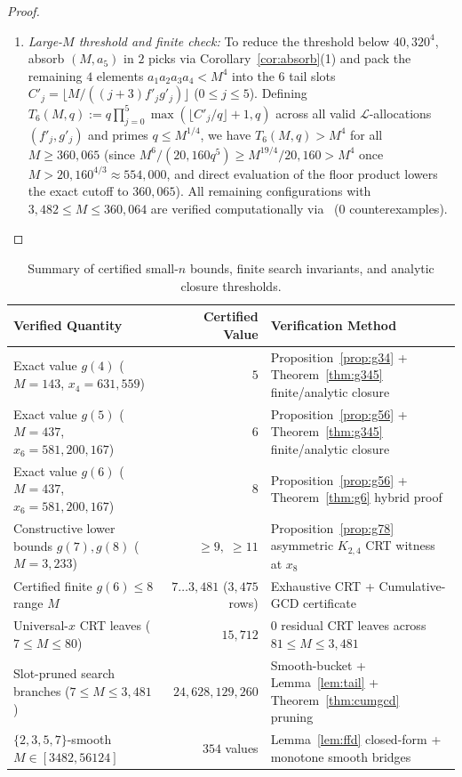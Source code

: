 \documentclass[11pt]{article}
\begin{document}
\begin{proof}
\begin{enumerate}
\begin{itemize}
\begin{itemize}
\begin{enumerate}
\item \emph{Large-$M$ threshold and finite check:} To reduce the threshold below $40{,}320^4$, absorb $(M, a_5)$ in $2$ picks via Corollary~\ref{cor:absorb}(1) and pack the remaining $4$ elements $a_1 a_2 a_3 a_4 < M^4$ into the $6$ tail slots $C'_j = \lfloor M / ((j + 3) f'_j g'_j) \rfloor$ ($0 \le j \le 5$). Defining $T_6(M, q) := q \prod_{j = 0}^5 \max(\lfloor C'_j / q \rfloor + 1, q)$ across all valid $\mathcal{L}$-allocations $(f'_j, g'_j)$ and primes $q \le M^{1/4}$, we have $T_6(M, q) > M^4$ for all $M \ge 360{,}065$ (since $M^6 / (20{,}160 q^5) \ge M^{19/4} / 20{,}160 > M^4$ once $M > 20{,}160^{4/3} \approx 554{,}000$, and direct evaluation of the floor product lowers the exact cutoff to $360{,}065$). All remaining configurations with $3{,}482 \le M \le 360{,}064$ are verified computationally via~\cite{bergstrom26smallcode} ($0$ counterexamples).
\end{enumerate}
\end{itemize}
\end{itemize}
\end{enumerate}
\end{proof}

\begin{table}[ht]
\centering
\small
\begin{tabular}{p{5.1cm}rp{5.5cm}}
\toprule
Verified Quantity & Certified Value & Verification Method \\
\midrule
Exact value $g(4)$ ($M = 143$, $x_4 = 631{,}559$) & $5$ & Proposition~\ref{prop:g34} + Theorem~\ref{thm:g345} finite/analytic closure \\
Exact value $g(5)$ ($M = 437$, $x_6 = 581{,}200{,}167$) & $6$ & Proposition~\ref{prop:g56} + Theorem~\ref{thm:g345} finite/analytic closure \\
Exact value $g(6)$ ($M = 437$, $x_6 = 581{,}200{,}167$) & $8$ & Proposition~\ref{prop:g56} + Theorem~\ref{thm:g6} hybrid proof \\
Constructive lower bounds $g(7), g(8)$ ($M = 3{,}233$) & $\ge 9,\; \ge 11$ & Proposition~\ref{prop:g78} asymmetric $K_{2, 4}$ CRT witness at $x_8$ \\
Certified finite $g(6) \le 8$ range $M$ & $7 \dots 3{,}481$ ($3{,}475$ rows) & Exhaustive CRT + Cumulative-GCD certificate~\cite{bergstrom26smallcode} \\
Universal-$x$ CRT leaves ($7 \le M \le 80$) & $15{,}712$ & $0$ residual CRT leaves across $81 \le M \le 3{,}481$ \\
Slot-pruned search branches ($7 \le M \le 3{,}481$) & $24{,}628{,}129{,}260$ & Smooth-bucket + Lemma~\ref{lem:tail} + Theorem~\ref{thm:cumgcd} pruning~\cite{bergstrom26smallcode} \\
$\{2, 3, 5, 7\}$-smooth $M \in [3482, 56124]$ & $354$ values & Lemma~\ref{lem:ffd} closed-form + monotone smooth bridges~\cite{bergstrom26smallcode} \\
\bottomrule
\end{tabular}
\caption{Summary of certified small-$n$ bounds, finite search invariants, and analytic closure thresholds.}
\label{tab:tools}
\end{table}
\end{document}
